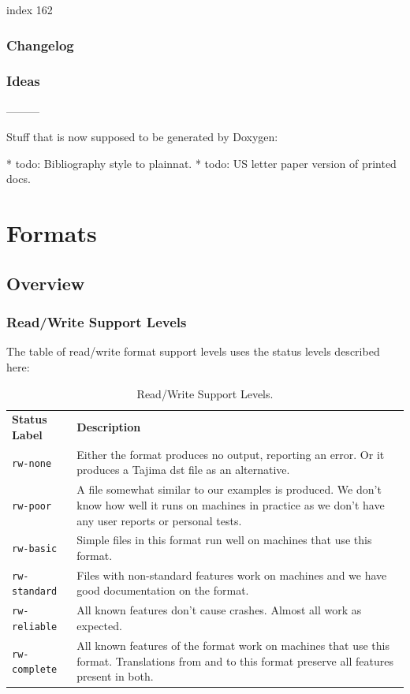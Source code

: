 \documentclass[a4paper]{report}
\begin{document}
index 162


\subsection{Changelog}

\subsection{Ideas}
---------

Stuff that is now supposed to be generated by Doxygen:

* todo: Bibliography style to plainnat.
* todo: US letter paper version of printed docs.

\chapter{Formats}

\section{Overview}

\subsection{Read/Write Support Levels}

The table of read/write format support levels uses the status levels described here:

\begin{longtable}{p{4cm} p{8cm}}
\caption{Read/Write Support Levels.}
\label{tab:read-write-support} \\
\textbf{Status Label} &
\textbf{Description} \\

\texttt{rw-none} &
Either the format produces no output, reporting an error. Or it produces a
Tajima dst file as an alternative. \\

\texttt{rw-poor} &
A file somewhat similar to our examples is produced. We don't know how well
it runs on machines in practice as we don't have any user reports or personal
tests. \\

\texttt{rw-basic} &
Simple files in this format run well on machines that use this format. \\

\texttt{rw-standard} &
Files with non-standard features work on machines and we have good documentation
on the format. \\

\texttt{rw-reliable} &
All known features don't cause crashes. Almost all work as expected. \\

\texttt{rw-complete} &
All known features of the format work on machines that use this format.
Translations from and to this format preserve all features present in both.
\end{longtable}
\end{document}
